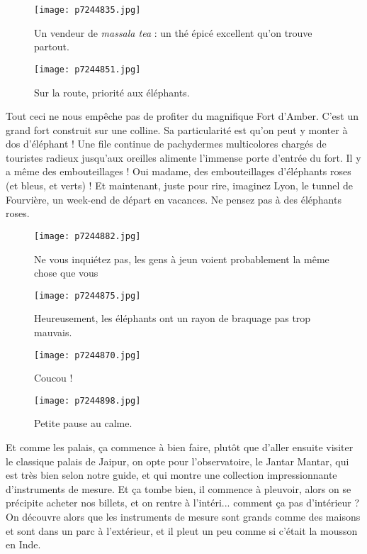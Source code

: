 \documentclass{book}
\begin{document}
\begin{figure}[h]
\centering
\texttt{[image: p7244835.jpg]}
\caption*{Un vendeur de \emph{massala tea} : un thé épicé excellent qu'on trouve partout.}
\end{figure}


\begin{figure}[h]
\centering
\texttt{[image: p7244851.jpg]}
\caption*{Sur la route, priorité aux éléphants.}
\end{figure}

Tout ceci ne nous empêche pas de profiter du magnifique Fort d'Amber. C'est un grand fort construit sur une colline. Sa particularité est qu'on peut y monter à dos d'éléphant ! Une file continue de pachydermes multicolores chargés de touristes radieux jusqu'aux oreilles alimente l'immense porte d'entrée du fort. Il y a même des embouteillages ! Oui madame, des embouteillages d'éléphants roses (et bleus, et verts) ! Et maintenant, juste pour rire, imaginez Lyon, le tunnel de Fourvière, un week-end de départ en vacances. Ne pensez pas à des éléphants roses.


\begin{figure}[h]
\centering
\texttt{[image: p7244882.jpg]}
\caption*{Ne vous inquiétez pas, les gens à jeun voient probablement la même chose que vous}
\end{figure}


\begin{figure}[h]
\centering
\texttt{[image: p7244875.jpg]}
\caption*{Heureusement, les éléphants ont un rayon de braquage pas trop mauvais.}
\end{figure}


\begin{figure}[h]
\centering
\texttt{[image: p7244870.jpg]}
\caption*{Coucou !}
\end{figure}


\begin{figure}[h]
\centering
\texttt{[image: p7244898.jpg]}
\caption*{Petite pause au calme.}
\end{figure}

Et comme les palais, ça commence à bien faire, plutôt que d'aller ensuite visiter le classique palais de Jaipur, on opte pour l'observatoire, le Jantar Mantar, qui est très bien selon notre guide, et qui montre une collection impressionnante d'instruments de mesure. Et ça tombe bien, il commence à pleuvoir, alors on se précipite acheter nos billets, et on rentre à l'intéri... comment ça pas d'intérieur ? On découvre alors que les instruments de mesure sont grands comme des maisons et sont dans un parc à l'extérieur, et il pleut un peu comme si c'était la mousson en Inde.
\end{document}

